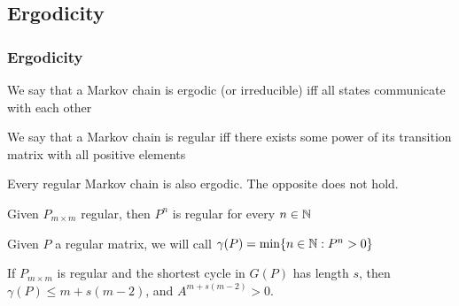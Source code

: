 \subsection{Ergodicity}
 \begin{frame}\frametitle{Ergodicity}
    \vspace{2em}
    
    \begin{definition}
    We say that a Markov chain is ergodic (or irreducible) iff all states communicate 
    with each other
    \end{definition}

    \begin{definition}
    We say that a Markov chain is regular iff there exists some power of its transition 
    matrix with all positive elements
    \end{definition}

    \begin{proposition}
    Every regular Markov chain is also ergodic. The opposite does not hold.
    \end{proposition}

    \begin{lemma}
    Given \(P_{m\times m}\) regular, then \(P^n\) is regular for every \(n\in \mathbb{N}\)
    \end{lemma}
    
    \begin{definition}
    Given \(P\) a regular matrix, we will call \(\gamma(P) = \min\{n \in \mathbb{N}: P^n > 0\}\)
    \end{definition}
    
    \begin{theorem}
    If \(P_{m\times m}\) is regular and the shortest cycle in \(G(P)\) has length 
    \(s\), then \(\gamma(P) \le m + s(m - 2)\), and \(A^{m + s(m - 2)} > 0\).
    \end{theorem}
\end{frame}

